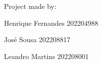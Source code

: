 Project made by\+:~\newline

\begin{DoxyItemize}
\item Henrique Fernandes 202204988
\item José Sousa 202208817
\item Leandro Martins 202208001 
\end{DoxyItemize}